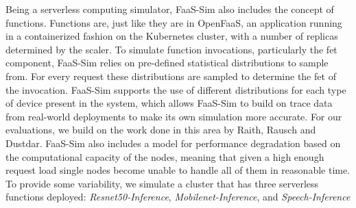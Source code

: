 Being a serverless computing simulator, FaaS-Sim also includes the concept of functions.
Functions are, just like they are in OpenFaaS, an application running in a containerized fashion on the Kubernetes cluster, with a number of replicas determined by the scaler.
To simulate function invocations, particularly the \gls{fet} component, FaaS-Sim relies on pre-defined statistical distributions to sample from.
For every request these distributions are sampled to determine the \gls{fet} of the invocation.
FaaS-Sim supports the use of different distributions for each type of device present in the system, which allows FaaS-Sim to build on trace data from real-world deployments to make its own simulation more accurate.
For our evaluations, we build on the work done in this area by Raith, Rausch and Dustdar\cite{philipp-da}.
FaaS-Sim also includes a model for performance degradation based on the computational capacity of the nodes, meaning that given a high enough request load single nodes become unable to handle all of them in reasonable time.
To provide some variability, we simulate a cluster that has three serverless functions deployed: \textit{Resnet50-Inference}, \textit{Mobilenet-Inference}, and \textit{Speech-Inference}


